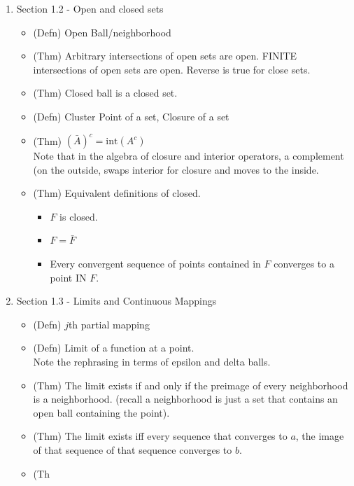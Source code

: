 \documentclass[12pt]{article}
\theoremstyle{definition}
\def\R{{\mathbb R}}
\begin{document}
\begin{enumerate}
\begin{enumerate}
\begin{itemize}
	    \item (Defn) Convergence or limit of a sequence of vectors in $ \R^n $.
	    \item (Thm) A sequence of vectors converges iff each sequence of components converges.
	    \item (Thm) The limit operation on vectors ist still linear.
	    \end{itemize}
	\item Section 1.2 - Open and closed sets
	    \begin{itemize}
		\item (Defn) Open Ball/neighborhood
	\item (Thm) Arbitrary intersections of open sets are open. FINITE intersections of open sets are open. Reverse is true for close sets.
	\item (Thm) Closed ball is a closed set.
	\item (Defn) Cluster Point of a set, Closure of a set
	\item (Thm) $ (\bar{A})^c = \text{int}(A^c) $\\
	    Note that in the algebra of closure and interior operators, a complement (on the outside, swaps interior for closure and moves to the inside.
	\item (Thm) Equivalent definitions of closed.
	    \begin{itemize}
		\item $ F $ is closed.
		\item $ F=\bar{F} $
		\item Every  convergent sequence of points contained in $ F $ converges to a point IN $ F. $
	    \end{itemize}
	    
	     
	    \end{itemize}
	\item Section 1.3 - Limits and Continuous Mappings
	    \begin{itemize}
		\item (Defn) $ j $th partial mapping
		\item (Defn) Limit of a function at a point.\\
		    Note the rephrasing in terms of epsilon and delta balls.
		\item (Thm) The limit exists if and only if the preimage of every neighborhood is a neighborhood. (recall a neighborhood is just a set that contains an open ball containing the point).
		\item (Thm) The limit exists iff every sequence that converges to $a$, the image of that sequence of that sequence converges to $b$.
		\item (Th

	    \end{itemize}
	    
    \end{enumerate}
    
\end{enumerate}
\end{document}
